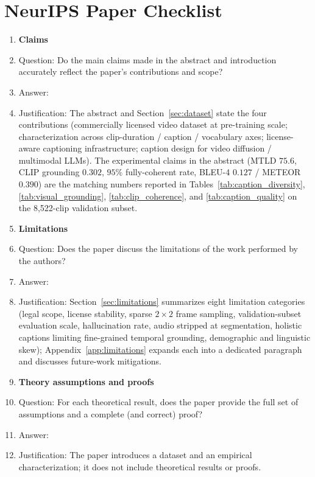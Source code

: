 \section*{NeurIPS Paper Checklist}

\begin{enumerate}

\item {\bf Claims}
    \item[] Question: Do the main claims made in the abstract and introduction accurately reflect the paper's contributions and scope?
    \item[] Answer: \answerYes{}
    \item[] Justification: The abstract and Section~\ref{sec:dataset} state the four contributions (commercially licensed video dataset at pre-training scale; characterization across clip-duration / caption / vocabulary axes; license-aware captioning infrastructure; caption design for video diffusion / multimodal LLMs). The experimental claims in the abstract (MTLD $75.6$, CLIP grounding $0.302$, $95\%$ fully-coherent rate, BLEU-4 $0.127$ / METEOR $0.390$) are the matching numbers reported in Tables~\ref{tab:caption_diversity}, \ref{tab:visual_grounding}, \ref{tab:clip_coherence}, and \ref{tab:caption_quality} on the 8{,}522-clip validation subset.

\item {\bf Limitations}
    \item[] Question: Does the paper discuss the limitations of the work performed by the authors?
    \item[] Answer: \answerYes{}
    \item[] Justification: Section~\ref{sec:limitations} summarizes eight limitation categories (legal scope, license stability, sparse $2\times 2$ frame sampling, validation-subset evaluation scale, hallucination rate, audio stripped at segmentation, holistic captions limiting fine-grained temporal grounding, demographic and linguistic skew); Appendix~\ref{app:limitations} expands each into a dedicated paragraph and discusses future-work mitigations.

\item {\bf Theory assumptions and proofs}
    \item[] Question: For each theoretical result, does the paper provide the full set of assumptions and a complete (and correct) proof?
    \item[] Answer: \answerNA{}
    \item[] Justification: The paper introduces a dataset and an empirical characterization; it does not include theoretical results or proofs.


\end{enumerate}
